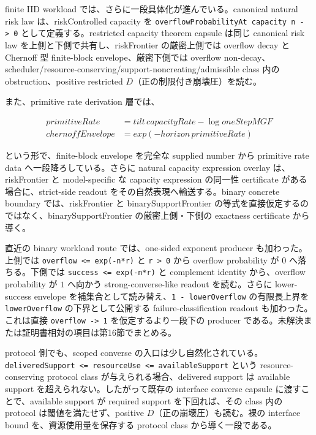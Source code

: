\documentclass[12pt,a4paper]{article}
\begin{document}
finite IID workload では、さらに一段具体化が進んでいる。canonical natural risk law は、riskControlled capacity を \texttt{overflowProbabilityAt\ capacity\ n\ -\textgreater{}\ 0} として定義する。restricted capacity theorem capsule は同じ canonical risk law を上側と下側で共有し、riskFrontier の厳密上側では overflow decay と Chernoff 型 finite-block envelope、厳密下側では overflow non-decay、scheduler/resource-conserving/support-noncreating/admissible class 内の obstruction、positive restricted \(D\)（正の制限付き崩壊圧）を読む。

また、primitive rate derivation 層では、

\[
\begin{aligned}
primitiveRate &= tilt \, capacityRate - \log oneStepMGF \\
chernoffEnvelope &= exp (-horizon \, primitiveRate)
\end{aligned}
\]

という形で、finite-block envelope を完全な supplied number から primitive rate data へ一段降ろしている。さらに natural capacity expression overlay は、riskFrontier と model-specific な capacity expression の同一性 certificate がある場合に、strict-side readout をその自然表現へ輸送する。binary concrete boundary では、riskFrontier と binarySupportFrontier の等式を直接仮定するのではなく、binarySupportFrontier の厳密上側・下側の exactness certificate から導く。

直近の binary workload route では、one-sided exponent producer も加わった。上側では \texttt{overflow\ \textless{}=\ exp(-n*r)} と \texttt{r\ \textgreater{}\ 0} から overflow probability が \(0\) へ落ちる。下側では \texttt{success\ \textless{}=\ exp(-n*r)} と complement identity から、overflow probability が \(1\) へ向かう strong-converse-like readout を読む。さらに lower-success envelope を補集合として読み替え、\texttt{1\ -\ lowerOverflow} の有限長上界を \texttt{lowerOverflow} の下界として公開する failure-classification readout も加わった。これは直接 \texttt{overflow\ -\textgreater{}\ 1} を仮定するより一段下の producer である。未解決または証明書相対の項目は第16節でまとめる。

protocol 側でも、scoped converse の入口は少し自然化されている。\texttt{deliveredSupport\ \textless{}=\ resourceUse\ \textless{}=\ availableSupport} という resource-conserving protocol class が与えられる場合、delivered support は available support を超えられない。したがって既存の interface converse capsule に渡すことで、available support が required support を下回れば、その class 内の protocol は閾値を満たせず、positive \(D\)（正の崩壊圧）も読む。裸の interface bound を、資源使用量を保存する protocol class から導く一段である。
\end{document}
